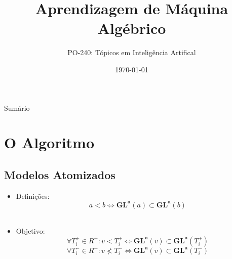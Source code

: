 \documentclass{beamer}
\title[AM Algébrico]{Aprendizagem de Máquina Algébrico}
\subtitle{PO-240: Tópicos em Inteligência Artifical}
\institute{ITA}
\author[Caio \& Fábio \& Johnnie]
{%
  \texorpdfstring{
    \begin{columns}%
      \column{.30\linewidth}
      \centering
      Caio Costa\\
      \href{mailto:caio.costa@ga.ita.br}{caio.costa@ga.ita.br}
      \column{.30\linewidth}
      \centering
      Fábio Alan\\
      \href{mailto:fabio.alan@ga.ita.br}{fabio.alan@ga.ita.br}
      \column{.30\linewidth}
      \centering
      Johnnie Bastista\\
      \href{mailto:johnnie@ita.br}{johnnie@ita.br}
    \end{columns}
  }
  {Caio \& Fábio \& Johnnie}
}
\date{\today}
\begin{document}

\begin{frame}
    \titlepage
\end{frame}

\begin{frame}{Sumário}
    \setcounter{tocdepth}{2}
    \tableofcontents
\end{frame}





\section{O Algoritmo}


\subsection{Modelos Atomizados}
\begin{frame}{\subsecname}
    \begin{itemize}
        \item Definições: \\
             {\[a < b \iff \mathbf{GL^a}(a) \subset \mathbf{GL^a}(b)\]}\\
        \item<3-> Objetivo: \\
            \[\forall T_i^{+} \in R^{+}\colon v < T_i^{+} \iff \mathbf{GL^a}(v) \subset \mathbf{GL^a}(T_i^{+})\]
            \[\forall T_i^{-} \in R^{-}\colon v \not< T_i^{-} \iff \mathbf{GL^a}(v) \subset \mathbf{GL^a}(T_i^{-})\]
    \end{itemize}
\end{frame}
\end{document}
